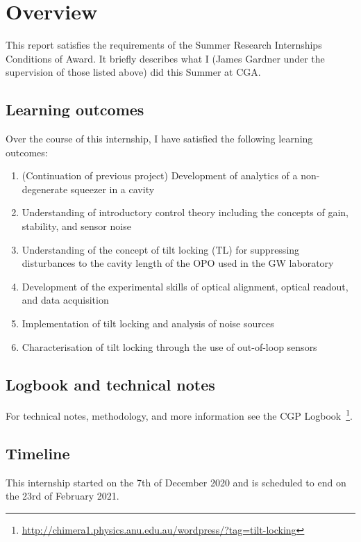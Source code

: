\documentclass[aps,pra,superscriptaddress,reprint,nofootinbib]{revtex4-1}
\begin{document}
\section{Overview}

This report satisfies the requirements of the Summer Research Internships Conditions of Award. It briefly describes what I (James Gardner under the supervision of those listed above) did this Summer at CGA.

\subsection{Learning outcomes}

Over the course of this internship, I have satisfied the following learning outcomes:
\begin{enumerate}
\item (Continuation of previous project) Development of analytics of a non-degenerate squeezer in a cavity 
\item Understanding of introductory control theory including the concepts of gain, stability, and sensor noise
\item Understanding of the concept of tilt locking (TL) for suppressing disturbances to the cavity length of the OPO used in the GW laboratory
\item Development of the experimental skills of optical alignment, optical readout, and data acquisition
\item Implementation of tilt locking and analysis of noise sources
\item Characterisation of tilt locking through the use of out-of-loop sensors
\end{enumerate}

\subsection{Logbook and technical notes}

For technical notes, methodology, and more information see the CGP Logbook~\footnote{\url{http://chimera1.physics.anu.edu.au/wordpress/?tag=tilt-locking}}.

\subsection{Timeline}

This internship started on the 7th of December 2020 and is scheduled to end on the 23rd of February 2021.
\end{document}
